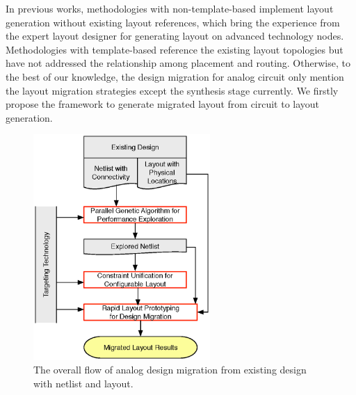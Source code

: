     In previous works, methodologies with non-template-based \cite{apnsi-pohung-dac07,GeneralRouter-CompEuro89,sensitAR-iccad90,arearouting-tcad1993,KOAN_ANAGRAMII-JSSC1991,AnalogRouteMatching-iccad2009,ppraic_Linfu_iccad2010,phLin-dac2008} implement layout generation without existing layout references, which bring the experience from the expert layout designer for generating layout on advanced technology nodes. Methodologies with template-based \cite{msc-bhattacharya-tcad06,ALP_YPWeng_iccad2011,ymYang-isqed2010,LAYGENII_TCAD13} reference the existing layout topologies but have not addressed the relationship among placement and routing. Otherwise, to the best of our knowledge, the design migration for analog circuit only mention the layout migration strategies except the synthesis stage currently. We firstly propose the framework to generate migrated layout from circuit to layout generation.

    \begin{figure}[ht]
      \centerline{
      \includegraphics[width=0.6\textwidth]{Fig/Introduction/OverallFlow.eps}}
      \caption{The overall flow of analog design migration from existing design with netlist and layout.} 
      \label{fig:OverallFlow}
    \end{figure}


